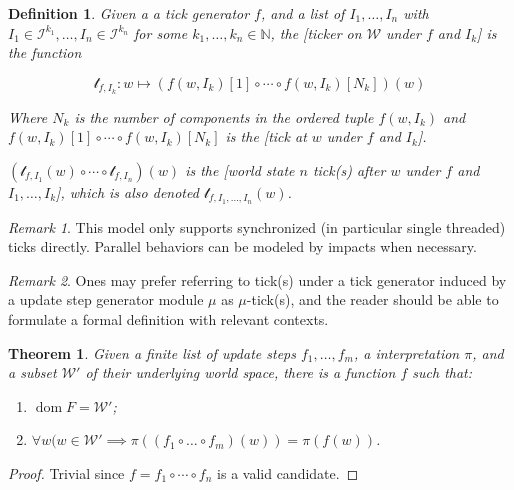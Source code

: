 \documentclass{book}
\newtheorem{definition}{Definition}
\newtheorem{theorem}{Theorem}
\theoremstyle{definition}\newtheorem{mechanism}{Mechanism}
\theoremstyle{remark}\newtheorem*{remark}{Remark}
\begin{document}
\begin{definition}
	Given a a tick generator $f$, and a list of  $I_1, \dots, I_n$ with $I_1 \in \mathcal I^{k_1}, \dots, I_n \in \mathcal I^{k_n}$ for some $k_1, \dots, k_n \in \mathbb N$, the [ticker on $\mathcal W$ under $f$ and $I_k$] is the function
	
	\begin{equation*}
		\mathcal t_{f, I_k}: w \mapsto \left(f(w, I_k)[1] \circ \cdots \circ f(w, I_k)[N_k]\right)(w)
	\end{equation*}
	
	Where $N_k$ is the number of components in the ordered tuple $f(w, I_k)$ and $f(w, I_k)[1] \circ \cdots \circ f(w, I_k)[N_k]$ is the [tick at $w$ under $f$ and $I_k$].
	
	$\left(\mathcal t_{f, I_1}(w) \circ \cdots \circ \mathcal t_{f, I_n}\right)(w)$ is the [world state $n$ tick(s) after $w$ under $f$ and $I_1, \dots, I_k$], which is also denoted $\mathcal t_{f, I_1, \dots, I_n}(w)$.
\end{definition}

\begin{remark}
	This model only supports synchronized (in particular single threaded) ticks directly. Parallel behaviors can be modeled by impacts when necessary.
\end{remark}

\begin{remark}
	Ones may prefer referring  to tick(s) under a tick generator induced by a update step generator module $\mu$ as $\mu$-tick(s), and the reader should be able to formulate a formal definition with relevant contexts.
\end{remark}

\begin{theorem}
	Given a finite list of update steps $f_1, \dots, f_m$, a interpretation $\pi$, and a subset $\mathcal W'$ of their underlying world space, there is a function $f$ such that:
	
	\begin{enumerate}
		\item $\operatorname{dom} F = \mathcal W'$;
		\item $\forall w(w \in \mathcal W' \implies \pi((f_1 \circ \dots \circ f_m)(w)) = \pi(f(w))$.
	\end{enumerate}
\end{theorem}

\begin{proof}
	Trivial since $f = f_1 \circ \cdots \circ f_n$ is a valid candidate.
\end{proof}
\end{document}
